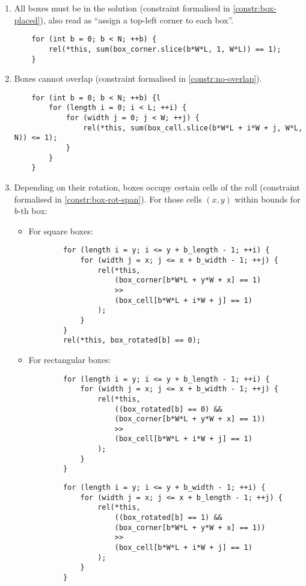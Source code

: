 \begin{enumerate}
    \item All boxes must be in the solution (constraint formalised in
    \ref{constr:box-placed}), also read as ``assign a top-left corner
    to each box''.
    
	\begin{lstlisting}
    for (int b = 0; b < N; ++b) {
		rel(*this, sum(box_corner.slice(b*W*L, 1, W*L)) == 1);
	}
    \end{lstlisting}
    
    \item Boxes cannot overlap (constraint formalised in \ref{constr:no-overlap}).
    
    \begin{lstlisting}
    for (int b = 0; b < N; ++b) {l
		for (length i = 0; i < L; ++i) {
			for (width j = 0; j < W; ++j) {
				rel(*this, sum(box_cell.slice(b*W*L + i*W + j, W*L, N)) <= 1);
			}
		}
	}
	\end{lstlisting}
    
    \item Depending on their rotation, boxes occupy certain cells of the roll
    (constraint formalised in \ref{constr:box-rot-span}). For those cells $(x,y)$
    within bounds for $b$-th box:

	\begin{itemize}
		\item For square boxes:
		\begin{lstlisting}
		for (length i = y; i <= y + b_length - 1; ++i) {
			for (width j = x; j <= x + b_width - 1; ++j) {
				rel(*this,
					(box_corner[b*W*L + y*W + x] == 1)
					>>
					(box_cell[b*W*L + i*W + j] == 1)
				);
			}
		}
		rel(*this, box_rotated[b] == 0);
		\end{lstlisting}
		
		\item For rectangular boxes:
		\begin{lstlisting}
		for (length i = y; i <= y + b_length - 1; ++i) {
			for (width j = x; j <= x + b_width - 1; ++j) {
				rel(*this,
					((box_rotated[b] == 0) &&
					(box_corner[b*W*L + y*W + x] == 1))
					>>
					(box_cell[b*W*L + i*W + j] == 1)
				);
			}
		}
		\end{lstlisting}
		\begin{lstlisting}
		for (length i = y; i <= y + b_width - 1; ++i) {
			for (width j = x; j <= x + b_length - 1; ++j) {
				rel(*this,
					((box_rotated[b] == 1) &&
					(box_corner[b*W*L + y*W + x] == 1))
					>>
					(box_cell[b*W*L + i*W + j] == 1)
				);
			}
		}
		\end{lstlisting}
	\end{itemize}
    

\end{enumerate}

